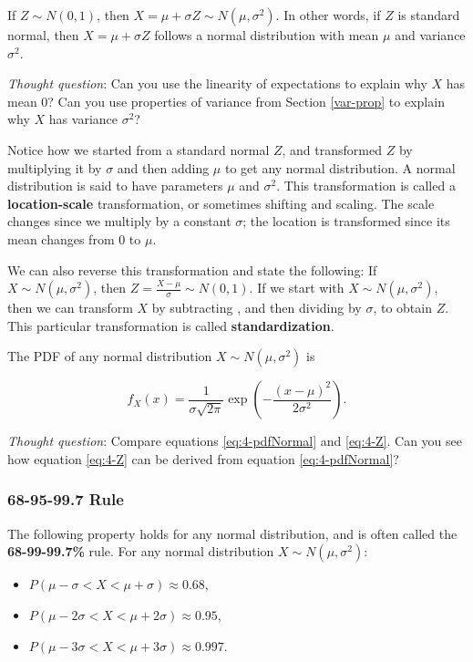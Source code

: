 \documentclass[
]{book}
\providecommand{\tightlist}{%
  \setlength{\itemsep}{0pt}\setlength{\parskip}{0pt}}
\begin{document}
If \(Z \sim N(0,1)\), then \(X = \mu + \sigma Z \sim N(\mu, \sigma^2)\). In other words, if \(Z\) is standard normal, then \(X = \mu + \sigma Z\) follows a normal distribution with mean \(\mu\) and variance \(\sigma^2\).

\emph{Thought question}: Can you use the linearity of expectations to explain why \(X\) has mean 0? Can you use properties of variance from Section \ref{var-prop} to explain why \(X\) has variance \(\sigma^2\)?

Notice how we started from a standard normal \(Z\), and transformed \(Z\) by multiplying it by \(\sigma\) and then adding \(\mu\) to get any normal distribution. A normal distribution is said to have parameters \(\mu\) and \(\sigma^2\). This transformation is called a \textbf{location-scale} transformation, or sometimes shifting and scaling. The scale changes since we multiply by a constant \(\sigma\); the location is transformed since its mean changes from 0 to \(\mu\).

We can also reverse this transformation and state the following: If \(X \sim N(\mu, \sigma^2)\), then \(Z = \frac{X-\mu}{\sigma} \sim N(0,1)\). If we start with \(X \sim N(\mu, \sigma^2)\), then we can transform \(X\) by subtracting \mu, and then dividing by \(\sigma\), to obtain \(Z\). This particular transformation is called \textbf{standardization}.

The PDF of any normal distribution \(X \sim N(\mu, \sigma^2)\) is

\begin{equation} 
f_X(x) = \frac{1}{\sigma \sqrt{2 \pi}} \exp \left(-\frac{(x - \mu)^2}{2 \sigma^2} \right).
\label{eq:4-pdfNormal}
\end{equation}

\emph{Thought question}: Compare equations \eqref{eq:4-pdfNormal} and \eqref{eq:4-Z}. Can you see how equation \eqref{eq:4-Z} can be derived from equation \eqref{eq:4-pdfNormal}?

\subsubsection{68-95-99.7 Rule}\label{rule}

The following property holds for any normal distribution, and is often called the \textbf{68-99-99.7\%} rule. For any normal distribution \(X \sim N(\mu, \sigma^2)\):

\begin{itemize}
\tightlist
\item
  \(P(\mu - \sigma < X < \mu + \sigma) \approx 0.68\),
\item
  \(P(\mu - 2\sigma < X < \mu + 2\sigma) \approx 0.95\),
\item
  \(P(\mu - 3\sigma < X < \mu + 3\sigma) \approx 0.997\).
\end{itemize}
\end{document}
